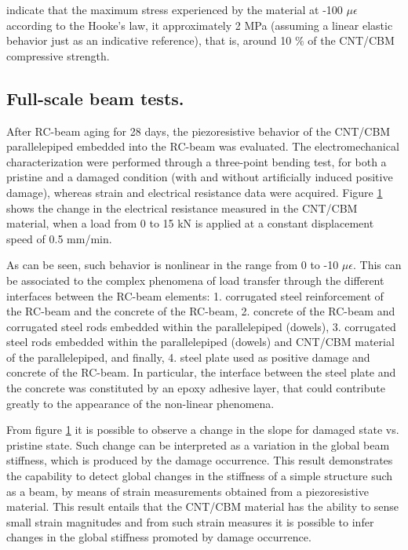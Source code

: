 \documentclass[twocolumn]{bmcart}%
\begin{document}
 indicate that the maximum stress experienced by the material at -100 $\mu \epsilon$ according to the Hooke’s law, it approximately 2 MPa (assuming a linear elastic behavior just as an indicative reference), that is, around 10 $\%$ of the CNT/CBM compressive strength. 


\subsection{ Full-scale beam tests.}

After RC-beam aging for 28 days, the piezoresistive behavior of the CNT/CBM parallelepiped embedded into the RC-beam was evaluated. The electromechanical characterization were performed through a three-point bending test, for both a pristine and a damaged condition (with and without artificially induced positive damage), whereas strain and electrical resistance data were acquired. Figure \ref{fig11} shows the change in the electrical resistance measured in the CNT/CBM material, when a load from 0 to 15 kN is applied at a constant displacement speed of 0.5 mm/min.

 As can be seen, such behavior is nonlinear in the range from 0 to -10 $\mu \epsilon$. This can be associated to the complex phenomena of load transfer through the different interfaces between the RC-beam elements: 1. corrugated steel reinforcement of the RC-beam and the concrete of the RC-beam, 2. concrete of the RC-beam and corrugated steel rods embedded within the parallelepiped (dowels), 3. corrugated steel rods embedded within the parallelepiped (dowels)  and CNT/CBM material of the parallelepiped, and finally, 4. steel plate used as positive damage and concrete of the RC-beam. In particular, the interface between the steel plate and the concrete was constituted by an epoxy adhesive layer, that could contribute greatly to the appearance of the non-linear phenomena.

\begin{figure}[h!]
  \caption{
      }
      \label{fig11}
      \end{figure}


From figure \ref{fig11} it is possible to observe a change in the slope for damaged state vs. pristine state. Such change can be interpreted as a variation in the global beam stiffness, which is produced by the damage occurrence. This result demonstrates the capability to detect global changes in the stiffness of a simple structure such as a beam, by means of strain measurements obtained from a piezoresistive material. This result entails that the CNT/CBM material has the ability to sense small strain magnitudes and from such strain measures it is possible to infer changes in the global stiffness promoted by damage occurrence.
\end{document}
